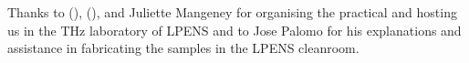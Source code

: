 \documentclass[aps,prb,twocolumn,groupedaddress]{revtex4-2}
\begin{document}
%



\begin{acknowledgments}
Thanks to (\todo{}), (\todo{}), and Juliette Mangeney for organising the practical and hosting us in the THz laboratory of LPENS and to Jose Palomo for his explanations and assistance in fabricating the samples in the LPENS cleanroom.

\end{acknowledgments}


\end{document}
